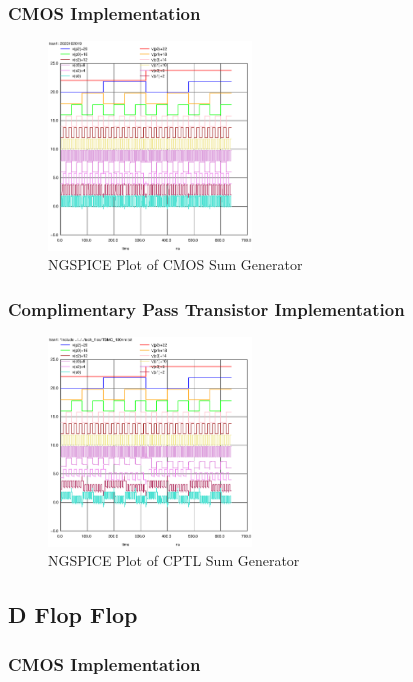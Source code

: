\documentclass[conference]{IEEEtran}
\begin{document}
\subsubsection{CMOS Implementation}

\begin{figure}[H]
    \centering
    \includegraphics[width=0.48\textwidth]{images/sum_gen_cmos_tran.eps}
    \caption{NGSPICE Plot of CMOS Sum Generator}
\end{figure}

\subsubsection{Complimentary Pass Transistor Implementation}

\begin{figure}[H]
    \centering
    \includegraphics[width=0.48\textwidth]{images/sum_gen_optimized_tran.eps}
    \caption{NGSPICE Plot of CPTL Sum Generator}
\end{figure}

\subsection{D Flop Flop}

\subsubsection{CMOS Implementation}
\end{document}

